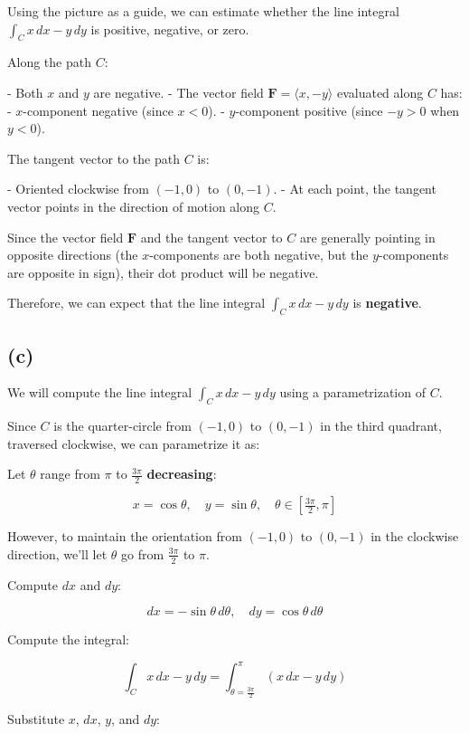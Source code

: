 \documentclass[11pt]{article}
\begin{document}
Using the picture as a guide, we can estimate whether the line integral $\displaystyle \int_C x \, dx - y \, dy$ is positive, negative, or zero.

Along the path $C$:

- Both $x$ and $y$ are negative.
- The vector field $\mathbf{F} = \langle x, -y \rangle$ evaluated along $C$ has:
  - $x$-component negative (since $x < 0$).
  - $y$-component positive (since $-y > 0$ when $y < 0$).

The tangent vector to the path $C$ is:

- Oriented clockwise from $(-1, 0)$ to $(0, -1)$.
- At each point, the tangent vector points in the direction of motion along $C$.

Since the vector field $\mathbf{F}$ and the tangent vector to $C$ are generally pointing in opposite directions (the $x$-components are both negative, but the $y$-components are opposite in sign), their dot product will be negative.

Therefore, we can expect that the line integral $\displaystyle \int_C x \, dx - y \, dy$ is \textbf{negative}.

\newpage

\subsection{(c)}

We will compute the line integral $\displaystyle \int_C x \, dx - y \, dy$ using a parametrization of $C$.

Since $C$ is the quarter-circle from $(-1, 0)$ to $(0, -1)$ in the third quadrant, traversed clockwise, we can parametrize it as:

Let $\theta$ range from $\pi$ to $\tfrac{3\pi}{2}$ \textbf{decreasing}:

\[
x = \cos \theta, \quad y = \sin \theta, \quad \theta \in \left[ \tfrac{3\pi}{2}, \pi \right]
\]

However, to maintain the orientation from $(-1, 0)$ to $(0, -1)$ in the clockwise direction, we'll let $\theta$ go from $\tfrac{3\pi}{2}$ to $\pi$.

Compute $dx$ and $dy$:

\[
dx = -\sin \theta \, d\theta, \quad dy = \cos \theta \, d\theta
\]

Compute the integral:

\[
\int_C x \, dx - y \, dy = \int_{\theta=\tfrac{3\pi}{2}}^{\pi} \left( x \, dx - y \, dy \right)
\]

Substitute $x$, $dx$, $y$, and $dy$:
\end{document}
